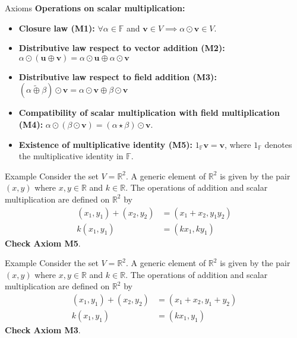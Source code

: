 \documentclass[11pt]{beamer}
\theoremstyle{plain}
\begin{document}
\begin{frame}{Axioms}
    \textbf{Operations on scalar multiplication:}
\begin{itemize}
    \item \textbf{Closure law (M1):} $\forall\alpha\in\mathbb F$ and $\mathbf{v}\in V\implies \alpha\odot\mathbf{v}\in V$.
    \item \textbf{Distributive law respect to vector addition (M2):} $\alpha \odot (\mathbf{u}\oplus\mathbf{v})=\alpha\odot\mathbf{u}\oplus\alpha\odot\mathbf{v}$
    \item \textbf{Distributive law respect to field addition (M3):} $(\alpha\tilde\oplus \beta)\odot \mathbf{v}=\alpha\odot \mathbf{v}\oplus \beta\odot\mathbf{v}$
    \item \textbf{Compatibility of scalar multiplication with field multiplication (M4):} $\alpha\odot(\beta \odot \mathbf{v})=(\alpha \star \beta)\odot \mathbf{v}$.
    \item \textbf{Existence of multiplicative identity (M5):} $1_{\mathbb F} \mathbf{v}=\mathbf{v}$, where $1_{\mathbb F}$ denotes the multiplicative identity in $\mathbb F$.
\end{itemize}
\end{frame}

\begin{frame}{Example}
    Consider the set $V=\mathbb R^2$. A generic element of $\mathbb R^2$ is given by the pair $(x,y)$ where $x,y\in\mathbb R$ and $k\in\mathbb R$. The operations of addition and scalar multiplication are defined on $\mathbb R^2$ by 
    \begin{align*}
        (x_1,y_1)+(x_2,y_2)&=(x_1+x_2,y_1y_2)\\
        k(x_1,y_1) &= (kx_1,ky_1)
    \end{align*}
    \pause 
    \textbf{Check Axiom M5}.
\end{frame}

\begin{frame}{Example}
    Consider the set $V=\mathbb R^2$. A generic element of $\mathbb R^2$ is given by the pair $(x,y)$ where $x,y\in\mathbb R$ and $k\in\mathbb R$. The operations of addition and scalar multiplication are defined on $\mathbb R^2$ by 
    \begin{align*}
        (x_1,y_1)+(x_2,y_2)&=(x_1+x_2,y_1+y_2)\\
        k(x_1,y_1) &= (kx_1,y_1)
    \end{align*}
    \pause 
    \textbf{Check Axiom M3}.
\end{frame}
\end{document}
